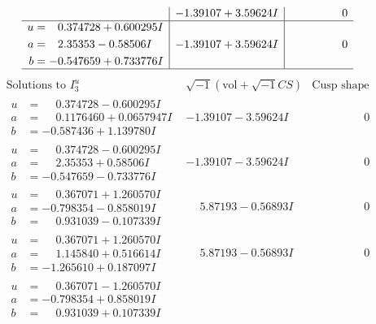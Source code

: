 \documentclass[1p]{elsarticle_modified}
\theoremstyle{definition}
\newcommand{\I}{\sqrt{-1}}
\begin{document}
$$\begin{array}{c|c|c}
 & -1.39107 + 3.59624 I & \phantom{-0.000000 } 0 \\ \hline\begin{aligned}
u &= \phantom{-}0.374728 + 0.600295 I \\
a &= \phantom{-}2.35353 - 0.58506 I \\
b &= -0.547659 + 0.733776 I\end{aligned}
 & -1.39107 + 3.59624 I & \phantom{-0.000000 } 0\\
 \hline 
 \end{array}$$\newpage$$\begin{array}{c|c|c}  
\text{Solutions to }I^u_{3}& \I (\text{vol} + \sqrt{-1}CS) & \text{Cusp shape}\\
 \hline 
\begin{aligned}
u &= \phantom{-}0.374728 - 0.600295 I \\
a &= \phantom{-}0.1176460 + 0.0657947 I \\
b &= -0.587436 + 1.139780 I\end{aligned}
 & -1.39107 - 3.59624 I & \phantom{-0.000000 } 0 \\ \hline\begin{aligned}
u &= \phantom{-}0.374728 - 0.600295 I \\
a &= \phantom{-}2.35353 + 0.58506 I \\
b &= -0.547659 - 0.733776 I\end{aligned}
 & -1.39107 - 3.59624 I & \phantom{-0.000000 } 0 \\ \hline\begin{aligned}
u &= \phantom{-}0.367071 + 1.260570 I \\
a &= -0.798354 - 0.858019 I \\
b &= \phantom{-}0.931039 - 0.107339 I\end{aligned}
 & \phantom{-}5.87193 - 0.56893 I & \phantom{-0.000000 } 0 \\ \hline\begin{aligned}
u &= \phantom{-}0.367071 + 1.260570 I \\
a &= \phantom{-}1.145840 + 0.516614 I \\
b &= -1.265610 + 0.187097 I\end{aligned}
 & \phantom{-}5.87193 - 0.56893 I & \phantom{-0.000000 } 0 \\ \hline\begin{aligned}
u &= \phantom{-}0.367071 - 1.260570 I \\
a &= -0.798354 + 0.858019 I \\
b &= \phantom{-}0.931039 + 0.107339 I\end{aligned}

\end{array}$$
\end{document}
